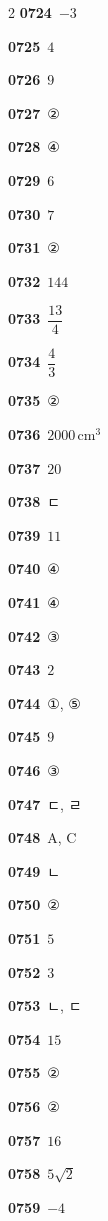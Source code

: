 \documentclass[10pt,a4paper]{article}
\begin{document}
\begin{multicols}{2}
\noindent\textbf{0724}\ $-3$\par
\noindent\textbf{0725}\ $4$\par
\noindent\textbf{0726}\ $9$\par
\noindent\textbf{0727}\ ②\par
\noindent\textbf{0728}\ ④\par
\noindent\textbf{0729}\ $6$\par
\noindent\textbf{0730}\ $7$\par
\noindent\textbf{0731}\ ②\par
\noindent\textbf{0732}\ $144$\par
\noindent\textbf{0733}\ $\dfrac{13}{4}$\par
\noindent\textbf{0734}\ $\dfrac{4}{3}$\par
\noindent\textbf{0735}\ ②\par
\noindent\textbf{0736}\ $2000\,\mathrm{cm}^3$\par
\noindent\textbf{0737}\ $20$\par
\noindent\textbf{0738}\ ㄷ\par
\noindent\textbf{0739}\ $11$\par
\noindent\textbf{0740}\ ④\par
\noindent\textbf{0741}\ ④\par
\noindent\textbf{0742}\ ③\par
\noindent\textbf{0743}\ $2$\par
\noindent\textbf{0744}\ ①, ⑤\par
\noindent\textbf{0745}\ $9$\par
\noindent\textbf{0746}\ ③\par
\noindent\textbf{0747}\ ㄷ, ㄹ\par
\noindent\textbf{0748}\ A, C\par
\noindent\textbf{0749}\ ㄴ\par
\noindent\textbf{0750}\ ②\par
\noindent\textbf{0751}\ $5$\par
\noindent\textbf{0752}\ $3$\par
\noindent\textbf{0753}\ ㄴ, ㄷ\par
\noindent\textbf{0754}\ $15$\par
\noindent\textbf{0755}\ ②\par
\noindent\textbf{0756}\ ②\par
\noindent\textbf{0757}\ $16$\par
\noindent\textbf{0758}\ $5\sqrt{2}$\par
\noindent\textbf{0759}\ $-4$\par

\end{multicols}
\end{document}
